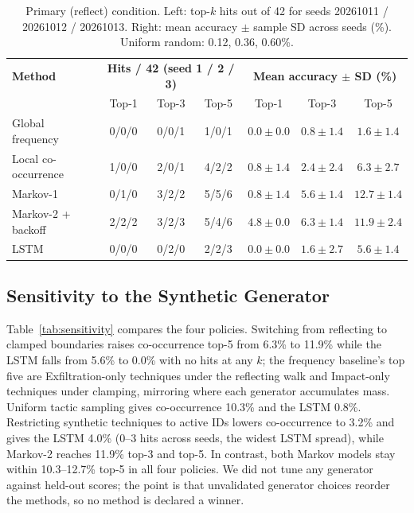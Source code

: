 \documentclass[conference]{IEEEtran}
\begin{document}
\begin{table}[!t]
\caption{Primary (reflect) condition. Left: top-$k$ hits out of 42 for seeds 20261011 / 20261012 / 20261013. Right: mean accuracy $\pm$ sample SD across seeds (\%). Uniform random: 0.12, 0.36, 0.60\%.}
\label{tab:primary}
\centering
\scriptsize
\begin{tabular}{|l|ccc|ccc|}
\hline
\textbf{Method} & \multicolumn{3}{c|}{\textbf{Hits / 42 (seed 1 / 2 / 3)}} & \multicolumn{3}{c|}{\textbf{Mean accuracy $\pm$ SD (\%)}} \\
 & Top-1 & Top-3 & Top-5 & Top-1 & Top-3 & Top-5 \\
\hline
Global frequency & 0/0/0 & 0/0/1 & 1/0/1 & $0.0 \pm 0.0$ & $0.8 \pm 1.4$ & $1.6 \pm 1.4$ \\
Local co-occurrence & 1/0/0 & 2/0/1 & 4/2/2 & $0.8 \pm 1.4$ & $2.4 \pm 2.4$ & $6.3 \pm 2.7$ \\
Markov-1 & 0/1/0 & 3/2/2 & 5/5/6 & $0.8 \pm 1.4$ & $5.6 \pm 1.4$ & $12.7 \pm 1.4$ \\
Markov-2 + backoff & 2/2/2 & 3/2/3 & 5/4/6 & $4.8 \pm 0.0$ & $6.3 \pm 1.4$ & $11.9 \pm 2.4$ \\
LSTM & 0/0/0 & 0/2/0 & 2/2/3 & $0.0 \pm 0.0$ & $1.6 \pm 2.7$ & $5.6 \pm 1.4$ \\
\hline
\end{tabular}
\end{table}

\subsection{Sensitivity to the Synthetic Generator}

Table~\ref{tab:sensitivity} compares the four policies. Switching from reflecting to clamped boundaries raises co-occurrence top-5 from 6.3\% to 11.9\% while the LSTM falls from 5.6\% to 0.0\% with no hits at any $k$; the frequency baseline's top five are Exfiltration-only techniques under the reflecting walk and Impact-only techniques under clamping, mirroring where each generator accumulates mass. Uniform tactic sampling gives co-occurrence 10.3\% and the LSTM 0.8\%. Restricting synthetic techniques to active IDs lowers co-occurrence to 3.2\% and gives the LSTM 4.0\% (0--3 hits across seeds, the widest LSTM spread), while Markov-2 reaches 11.9\% top-3 and top-5. In contrast, both Markov models stay within 10.3--12.7\% top-5 in all four policies. We did not tune any generator against held-out scores; the point is that unvalidated generator choices reorder the methods, so no method is declared a winner.
\end{document}
